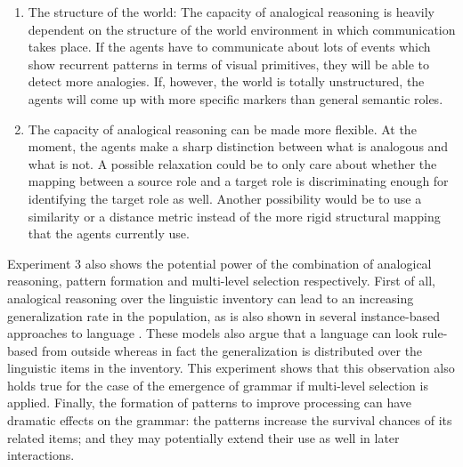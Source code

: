 \begin{enumerate}
\item The structure of the world: The capacity of analogical reasoning is heavily dependent on the structure of the world environment in which communication takes place. If the agents have to communicate about lots of events which show recurrent patterns in terms of visual primitives, they will be able to detect more analogies. If, however, the world is totally unstructured, the agents will come up with more specific markers than general semantic roles.
\item The capacity of analogical reasoning can be made more flexible. At the moment, the agents make a sharp distinction between what is analogous and what is not. A possible relaxation could be to only care about whether the mapping between a source role and a target role is discriminating enough for identifying the target role as well. Another possibility would be to use a similarity or a distance metric instead of the more rigid structural mapping that the agents currently use.
\end{enumerate}

Experiment 3 also shows the potential power of the combination of analogical reasoning, pattern formation and multi-level selection respectively. First of all, analogical reasoning over the linguistic inventory can lead to an increasing generalization rate in the population, as is also shown in several instance-based approaches to language \citep{daelemans05memory, skousen89analogical}. These models also argue that a language can look rule-based from outside whereas in fact the generalization is distributed over the linguistic items in the inventory. This experiment shows that this observation also holds true for the case of the emergence of grammar if multi-level selection is applied. Finally, the formation of patterns to improve processing can have dramatic effects on the grammar: the patterns increase the survival chances of its related items; and they may potentially extend their use as well in later interactions. 

